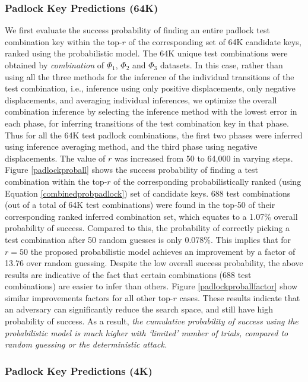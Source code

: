 \documentclass[]{IEEEtran}
\begin{document}
\subsubsection{\textbf{Padlock Key Predictions (64K)}}
\label{padlockkeypredictions}
We first evaluate the success probability of finding an entire padlock test combination key within the top-$r$ of the corresponding set of 64K candidate keys, ranked using the probabilistic model. The 64K unique test combinations were obtained by \emph{combination} of $\Phi_{1}$, $\Phi_{2}$ and $\Phi_{3}$ datasets. In this case, rather than using all the three methods for the inference of the individual transitions of the test combination, i.e., inference using only positive displacements, only negative displacements, and averaging individual inferences, we optimize the overall combination inference by selecting the inference method with the lowest error in each phase, for inferring transitions of the test combination key in that phase. Thus for all the 64K test padlock combinations, the first two phases were inferred using inference averaging method, and the third phase using negative displacements. 
The value of $r$ was increased from 50 to 64,000 in varying steps. Figure \ref{padlockproball} shows the success probability of finding a test combination within the top-$r$ of the corresponding probabilistically ranked (using Equation \ref{combinedprobpadlock}) set of candidate keys. 688 test combinations (out of a total of 64K test combinations) were found in the top-50 of their corresponding ranked inferred combination set, which equates to a 1.07\% overall probability of success. Compared to this, the probability of correctly picking a test combination after 50 random guesses is only 0.078\%. This implies that for $r=50$ the proposed probabilistic model achieves an improvement by a factor of 13.76 over random guessing. Despite the low overall success probability, the above results are indicative of the fact that certain combinations (688 test combinations) are easier to infer than others. Figure \ref{padlockproballfactor} show similar improvements factors for all other top-$r$ cases. These results indicate that an adversary can significantly reduce the search space, and still have high probability of success. As a result, \emph{the cumulative probability of success using the probabilistic model is much higher with `limited' number of trials, compared to random guessing or the deterministic attack.}

\subsubsection{\textbf{Padlock Key Predictions (4K)}}
\label{padlockkeypredictions4k}
\end{document}

